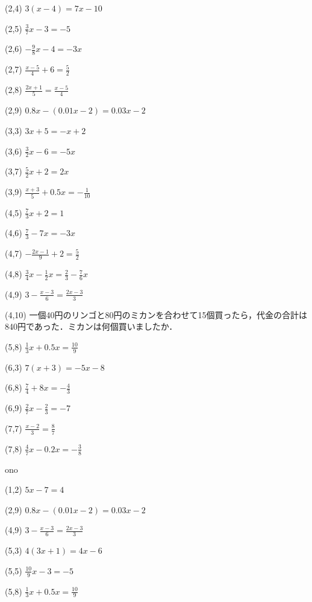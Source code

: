 \documentclass[a4paper,fleqn,papersize,15pt]{jsarticle}
\begin{document}
(2,4)  \large     $3(x -4) = 7x -10$

(2,5)  \large     $\frac{3}{7}x -3 = -5$

(2,6)  \large     $- \frac{9}{8}x -4 = -3x$

(2,7)  \large     $\frac{x-5}{4} + 6 = \frac{5}{2}$

(2,8)  \large     $\frac{2x+1}{5}  = \frac{x-5}{4}$

(2,9)  \large     $0.8x-(0.01x-2) = 0.03x-2$

(3,3)  \large     $3x + 5 = -x + 2$

(3,6)  \large     $\frac{3}{2}x -6 = -5x$

(3,7)  \large     $\frac{5}{2}x + 2 = 2x$

(3,9)  \large     $\frac{x+3}{5} +0.5x = -\frac{1}{10}$

(4,5)  \large     $\frac{7}{3}x + 2 = 1$

(4,6)  \large     $\frac{7}{3} -7x = -3x$

(4,7)  \large     $- \frac{2x-1}{9} + 2 = \frac{5}{2}$

(4,8)  \large     $\frac{3}{4}x-\frac{1}{2}x = \frac{2}{3}-\frac{7}{6}x$

(4,9)  \large     $ 3 - \frac{x-3}{6} = \frac{2x-3}{3}$

(4,10)  \large     一個40円のリンゴと80円のミカンを合わせて15個買ったら，代金の合計は840円であった．ミカンは何個買いましたか．

(5,8)  \large     $\frac{1}{3}x + 0.5x  = \frac{10}{9}$

(6,3)  \large     $7(x + 3) = -5x -8$

(6,8)  \large     $\frac{7}{4} + 8x = - \frac{4}{3}$

(6,9)  \large     $\frac{2}{7}x - \frac{2}{3} = -7$

(7,7)  \large     $\frac{x-2}{3}  = \frac{8}{7}$

(7,8)  \large     $\frac{4}{7}x -0.2x = - \frac{3}{8}$

\clearpage
ono     

 (1,2)  \large     $5x - 7 = 4$

(2,9)  \large     $0.8x-(0.01x-2) = 0.03x-2$

(4,9)  \large     $ 3 - \frac{x-3}{6} = \frac{2x-3}{3}$

(5,3)  \large     $4(3x + 1) = 4x -6$

(5,5)  \large     $\frac{10}{9}x -3 = -5$

(5,8)  \large     $\frac{1}{3}x + 0.5x  = \frac{10}{9}$
\end{document}
